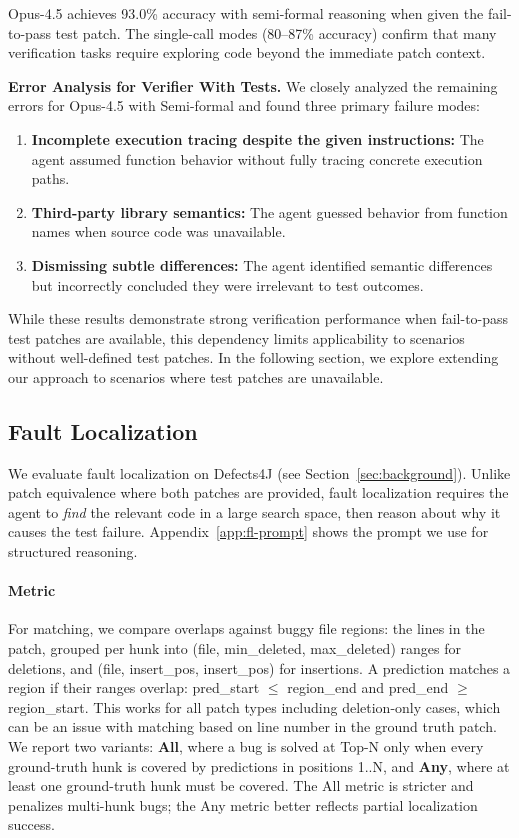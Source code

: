 \documentclass[]{meta}
\begin{document}
Opus-4.5 achieves 93.0\% accuracy with semi-formal reasoning when given the fail-to-pass test patch. The single-call modes (80--87\% accuracy) confirm that many verification tasks require exploring code beyond the immediate patch context.

\textbf{Error Analysis for Verifier With Tests.}
We closely analyzed the remaining errors for Opus-4.5 with Semi-formal and found three primary failure modes:
\begin{enumerate}
    \item \textbf{Incomplete execution tracing despite the given instructions:} The agent assumed function behavior without fully tracing concrete execution paths.

    \item \textbf{Third-party library semantics:} The agent guessed behavior from function names when source code was unavailable.

    \item \textbf{Dismissing subtle differences:} The agent identified semantic differences but incorrectly concluded they were irrelevant to test outcomes.
\end{enumerate}
While these results demonstrate strong verification performance when fail-to-pass test patches are available, this dependency limits applicability to scenarios without well-defined test patches. In the following section, we explore extending our approach to scenarios where test patches are unavailable.


\subsection{Fault Localization}

We evaluate fault localization on Defects4J (see Section~\ref{sec:background}). Unlike patch equivalence where both patches are provided, fault localization requires the agent to \emph{find} the relevant code in a large search space, then reason about why it causes the test failure.
Appendix~\ref{app:fl-prompt} shows the prompt we use for structured reasoning.


\paragraph{Metric}
For matching, we compare overlaps against buggy file regions: the lines in the patch, grouped per hunk into (file, min\_deleted, max\_deleted) ranges for deletions, and (file, insert\_pos, insert\_pos) for insertions. A prediction matches a region if their ranges overlap: pred\_start $\leq$ region\_end and pred\_end $\geq$ region\_start. This works for all patch types including deletion-only cases, which can be an issue with matching based on line number in the ground truth patch. We report two variants: \textbf{All}, where a bug is solved at Top-N only when every ground-truth hunk is covered by predictions in positions 1..N, and \textbf{Any}, where at least one ground-truth hunk must be covered. The All metric is stricter and penalizes multi-hunk bugs; the Any metric better reflects partial localization success.
\end{document}
